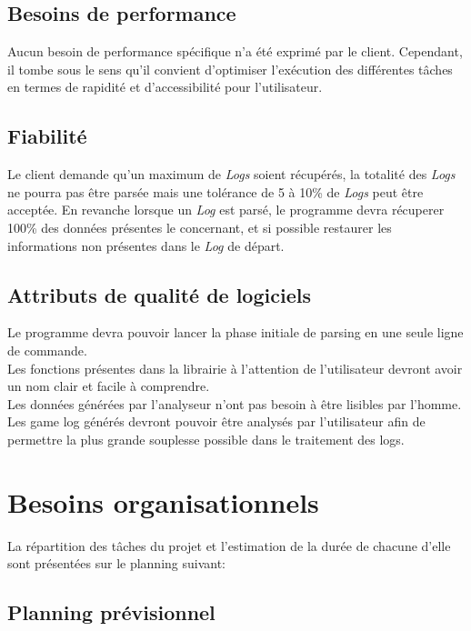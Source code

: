 \subsection{Besoins de performance}

Aucun besoin de performance spécifique n’a été exprimé par le client. Cependant, il tombe sous le sens qu'il convient d'optimiser l'exécution des différentes tâches en termes de rapidité et d'accessibilité pour l'utilisateur.\\


\subsection{Fiabilité}
Le client demande qu'un maximum de \textit{Logs} soient récupérés, la totalité des \textit{Logs} ne pourra pas être parsée mais une tolérance de 5 à 10\% de \textit{Logs} peut être acceptée.\newline
En revanche lorsque un \textit{Log} est parsé, le programme devra récuperer 100\% des données présentes le concernant, et si possible restaurer les informations non présentes dans le \textit{Log} de départ.

\subsection{Attributs de qualité de logiciels}

Le programme devra pouvoir lancer la phase initiale de parsing en une seule ligne de commande.\\
Les fonctions présentes dans la librairie à l'attention de l'utilisateur devront avoir un nom clair et facile à comprendre.\\
Les données générées par l'analyseur n’ont pas besoin à être lisibles par l'homme.\\
Les game log générés devront pouvoir être analysés par l'utilisateur afin de permettre la plus grande souplesse possible dans le traitement des logs.

\section{Besoins organisationnels}

La répartition des tâches du projet et l'estimation de la durée de chacune d'elle sont présentées sur le planning suivant:\\

\subsection{Planning prévisionnel}

